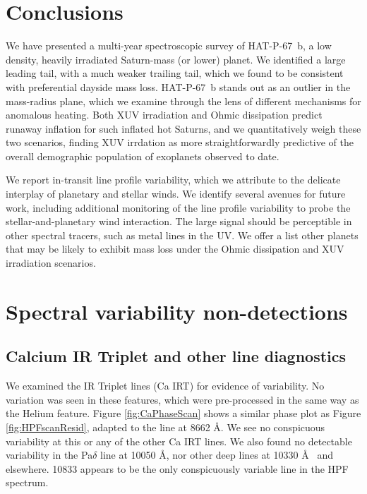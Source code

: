 \documentclass[twocolumn]{aastex631}
\begin{document}
\section{Conclusions}

We have presented a multi-year spectroscopic survey of HAT-P-67~b, a low density, heavily irradiated Saturn-mass (or lower) planet.  We identified a large leading tail, with a much weaker trailing tail, which we found to be consistent with preferential dayside mass loss.  HAT-P-67~b stands out as an outlier in the mass-radius plane, which we examine through the lens of different mechanisms for anomalous heating.  Both XUV irradiation and Ohmic dissipation predict runaway inflation for such inflated hot Saturns, and we quantitatively weigh these two scenarios, finding XUV irrdation as more straightforwardly predictive of the overall demographic population of exoplanets observed to date.  

We report in-transit line profile variability, which we attribute to the delicate interplay of planetary and stellar winds.  We identify several avenues for future work, including additional monitoring of the line profile variability to probe the stellar-and-planetary wind interaction.  The large signal should be perceptible in other spectral tracers, such as metal lines in the UV.  We offer a list other planets that may be likely to exhibit mass loss under the Ohmic dissipation and XUV irradiation scenarios.
 
\clearpage
\pagebreak


\appendix

\section{Spectral variability non-detections} \label{appendixSec}
\subsection{Calcium IR Triplet and other line diagnostics}
We examined the  IR Triplet lines (Ca IRT) for evidence of variability.  No variation was seen in these features, which were pre-processed in the same way as the Helium feature.  Figure \ref{fig:CaPhaseScan} shows a similar phase plot as Figure \ref{fig:HPFscanResid}, adapted to the line at 8662 \AA.  We see no conspicuous variability at this or any of the other Ca IRT lines.  We also found no detectable variability in the Pa$\delta$ line at 10050 \AA, nor other deep lines at 10330 \AA~ and elsewhere.   10833 appears to be the only conspicuously variable line in the HPF spectrum.
\end{document}
